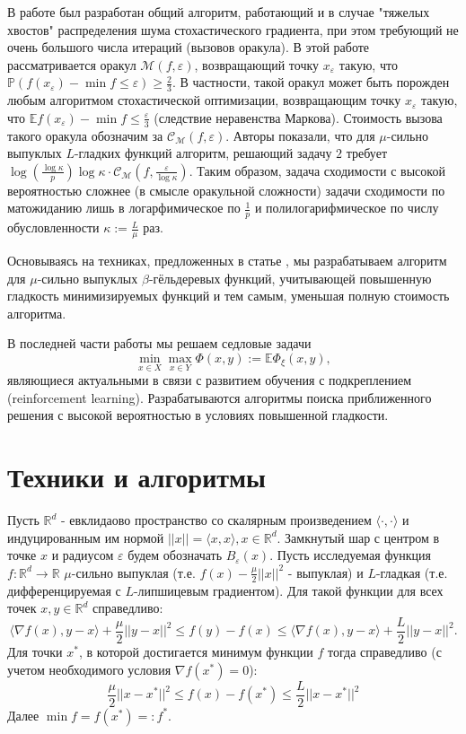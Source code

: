 \documentclass{article}
\newcommand{\R}{\mathbb{R}}
\newcommand{\E}{\mathbb{E}}
\newcommand{\e}{\varepsilon}
\begin{document}
В работе \cite{davis2021low} был разработан общий алгоритм, работающий и в случае "тяжелых хвостов" распределения шума стохастического градиента, при этом требующий не очень большого числа итераций (вызовов оракула).  В этой работе рассматривается оракул $\mathcal{M}(f, \e)$, возвращающий точку $x_{\e}$ такую, что $\mathds{P} (f(x_{\e})-\min f \le \e) \ge \frac{2}{3}$. В частности, такой оракул может быть порожден любым алгоритмом стохастической оптимизации, возвращающим точку $x_{\e}$ такую, что $\E{f(x_{\e})} - \min f \le \frac{\e}{3}$ (следствие неравенства Маркова). Стоимость вызова такого оракула обозначим за $\mathcal{C}_{\mathcal{M}}(f, \e)$. Авторы показали, что для $\mu$-сильно выпуклых $L$-гладких функций алгоритм, решающий задачу $2$ требует $\log({\frac{\log{\kappa}}{p}})\log{\kappa}\cdot \mathcal{C}_{\mathcal{M}}(f, \frac{\e}{\log{\kappa}})$. Таким образом, задача сходимости с высокой вероятностью сложнее (в смысле оракульной сложности) задачи сходимости по матожиданию лишь в логарфимическое по $\frac{1}{p}$ и полилогарифмическое по числу обусловленности $\kappa := \frac{L}{\mu}$ раз. 

Основываясь на техниках, предложенных в статье \cite{davis2021low}, мы разрабатываем алгоритм для $\mu$-сильно выпуклых $\beta$-гёльдеревых функций, учитывающей повышенную гладкость минимизируемых функций и тем самым, уменьшая полную стоимость алгоритма.

В последней части работы мы решаем седловые задачи \[\min_{x \in X} \max_{x \in Y} \Phi (x, y) := \E{\Phi_{\xi}(x, y)},\tag{4}\] являющиеся актуальными в связи с  развитием обучения с подкреплением (reinforcement learning). Разрабатываются алгоритмы поиска приближенного решения с высокой вероятностью в условиях повышенной гладкости.

\section{Техники и алгоритмы}
Пусть $\R^d$ - евклидаово пространство со скалярным произведением $\langle \cdot, \cdot \rangle$ и индуцированным им нормой $||x|| = \langle x, x\rangle, x \in \R^d$. Замкнутый шар с центром в точке $x$ и радиусом $\e$ будем обозначать $B_{\e} (x)$. Пусть исследуемая функция $f:\R^d \to \R$ $\mu$-сильно выпуклая (т.е. $f(x)-\frac{\mu}{2}||x||^2$ - выпуклая) и $L$-гладкая (т.е. дифференцируемая с $L$-липшицевым градиентом). Для такой функции для всех точек $x, y \in \R^d$ справедливо:
\[\langle \nabla f(x), y - x \rangle + \frac{\mu}{2} ||y - x||^2 \le f(y) - f(x) \le \langle \nabla f(x), y - x\rangle + \frac{L}{2} ||y - x||^2.\]
Для точки $x^*$, в которой достигается минимум функции $f$ тогда справедливо (с учетом необходимого условия $\nabla f(x^*) = 0$):
\[\frac{\mu}{2} ||x- x^*||^2 \le f(x) - f(x^*) \le \frac{L}{2} ||x - x^*||^2\]
Далее $\min f = f(x^*) =: f^*$.
\end{document}
